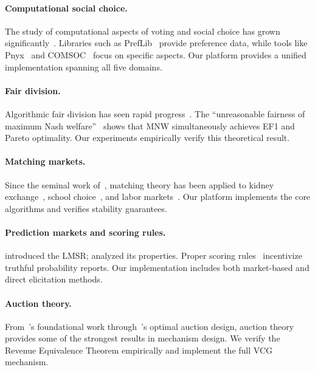 \documentclass[10pt]{article}
\begin{document}
\paragraph{Computational social choice.}
The study of computational aspects of voting and social choice has grown significantly~\citep{brandt2016handbook, conitzer2024social}. Libraries such as PrefLib~\citep{mattei2013preflib} provide preference data, while tools like Pnyx~\citep{boehmer2024pnyx} and COMSOC~\citep{endriss2017trends} focus on specific aspects. Our platform provides a unified implementation spanning all five domains.

\paragraph{Fair division.}
Algorithmic fair division has seen rapid progress~\citep{procaccia2013cake, aziz2020polynomial}. The ``unreasonable fairness of maximum Nash welfare''~\citep{caragiannis2019unreasonable} shows that MNW simultaneously achieves EF1 and Pareto optimality. Our experiments empirically verify this theoretical result.

\paragraph{Matching markets.}
Since the seminal work of~\citet{gale1962college}, matching theory has been applied to kidney exchange~\citep{roth2004kidney}, school choice~\citep{abdulkadiroglu2003school}, and labor markets~\citep{roth1984evolution}. Our platform implements the core algorithms and verifies stability guarantees.

\paragraph{Prediction markets and scoring rules.}
\citet{hanson2003combinatorial} introduced the LMSR; \citet{chen2007utility} analyzed its properties. Proper scoring rules~\citep{gneiting2007strictly, brier1950verification} incentivize truthful probability reports. Our implementation includes both market-based and direct elicitation methods.

\paragraph{Auction theory.}
From~\citet{vickrey1961counterspeculation}'s foundational work through~\citet{myerson1981optimal}'s optimal auction design, auction theory provides some of the strongest results in mechanism design. We verify the Revenue Equivalence Theorem empirically and implement the full VCG mechanism.
\end{document}
